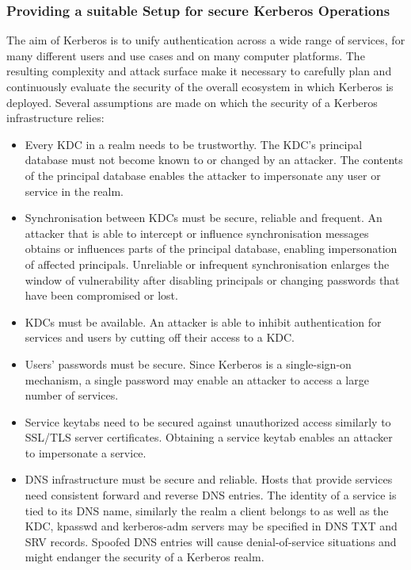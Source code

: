 \subsubsection{Providing a suitable Setup for secure Kerberos Operations}
\label{subsubsection:kerberos_secure_setup}

The aim of Kerberos is to unify authentication across a wide range of services, for many different users and use cases and on many computer platforms. The resulting complexity and attack surface make it necessary to carefully plan and continuously evaluate the security of the overall ecosystem in which Kerberos is deployed. Several assumptions are made on which the security of a Kerberos infrastructure relies:
\begin{itemize}
	\item Every KDC in a realm needs to be trustworthy. The KDC's principal database must not become known to or changed by an attacker. The contents of the principal database enables the attacker to impersonate any user or service in the realm.
	\item Synchronisation between KDCs must be secure, reliable and frequent. An attacker that is able to intercept or influence synchronisation messages obtains or influences parts of the principal database, enabling impersonation of affected principals. Unreliable or infrequent synchronisation enlarges the window of vulnerability after disabling principals or changing passwords that have been compromised or lost.
	\item KDCs must be available. An attacker is able to inhibit authentication for services and users by cutting off their access to a KDC.
	\item Users' passwords must be secure. Since Kerberos is a single-sign-on mechanism, a single password may enable an attacker to access a large number of services.
	\item Service keytabs need to be secured against unauthorized access similarly to SSL/TLS server certificates. Obtaining a service keytab enables an attacker to impersonate a service.
	\item DNS infrastructure must be secure and reliable. Hosts that provide services need consistent forward and reverse DNS entries. The identity of a service is tied to its DNS name, similarly the realm a client belongs to as well as the KDC, kpasswd and kerberos-adm servers may be specified in DNS TXT and SRV records. Spoofed DNS entries will cause denial-of-service situations and might endanger\cite{MITKrbDoc:realm_config,IETF:cat-krb-dns-locate-02} the security of a Kerberos realm.

\end{itemize}
